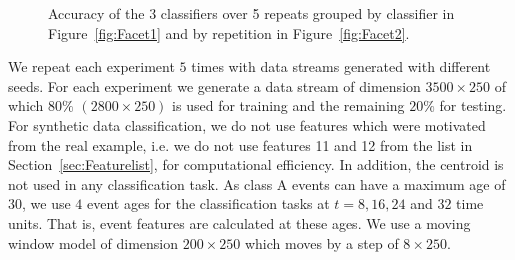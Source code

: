 \documentclass[a4paper,11pt]{article}
\begin{document}
\begin{figure}[!htb]
	\centering
	\caption{Accuracy of the 3 classifiers over 5 repeats grouped by classifier in Figure~\ref{fig:Facet1} and by repetition in Figure~\ref{fig:Facet2}.}
	\label{fig:3Classifiers}
\end{figure}

We repeat each experiment $5$ times with data streams generated with different seeds. For each experiment we generate a data stream of dimension $3500 \times 250$ of which $80\%$ $(2800 \times 250)$ is used for training and the remaining $20\%$ for testing. For synthetic data classification, we do not use features which were motivated from the real example, i.e. we do not use features 11 and 12 from the list in Section~\ref{sec:Featurelist}, for computational efficiency. In addition, the centroid is not used in any classification task. As class A events can have a maximum age of $30$, we use $4$ event ages for the classification tasks at $t = 8, 16, 24$ and $32$ time units. That is, event features are calculated at these ages. We use a moving window model of dimension $200 \times 250$ which moves by a step of $8 \times 250$.
\end{document}
